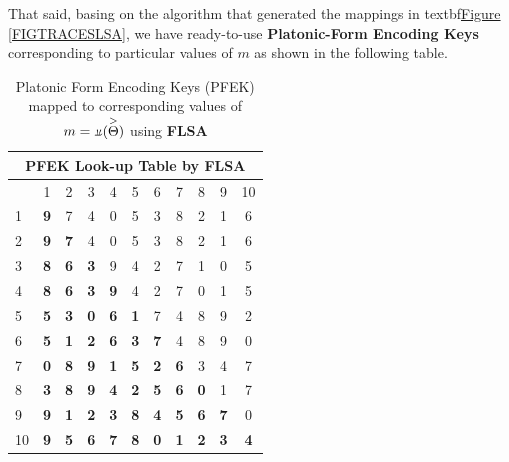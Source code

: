 \documentclass[a4paper, 18pt]{book} %
\newcommand{\invpi}{\rotatebox[origin=c]{180}{$\pi$}}
\begin{document}
\begin{appendices}
That said, basing on the algorithm that generated the mappings in textbf{\hyperref[FIGTRACESLSA]{Figure \ref{FIGTRACESLSA}}}, we have ready-to-use \textbf{Platonic-Form Encoding Keys} corresponding to particular values of $m$ as shown in the following table.\\


\begin{table}[H]
  \centering
  \Large
	\begin{tabular}[t]{|p{6cm}||c|c|c|c|c|c|c|c|c|c|}
	\hline
	\multicolumn{11}{|c|}{\textbf{PFEK Look-up Table by FLSA}}\\
	\hline
	\hline
	\diagbox{$m = \invpi(\overset{>}{\Theta})$}{$I(\omega_i,\overset{>}{\Theta})$} & 1 & 2 & 3 & 4 & 5 & 6 & 7 & 8 & 9 & 10\\
	\hline
	\hline
	1 & \textbf{9} & 7 & 4 & 0 & 5 & 3 & 8 & 2 & 1 & 6\\ 
	\hline 
	2 & \textbf{9} & \textbf{7} & 4 & 0 & 5 & 3 & 8 & 2 & 1 & 6\\ 
	\hline 
	3 & \textbf{8} & \textbf{6} & \textbf{3} & 9 & 4 & 2 & 7 & 1 & 0 & 5\\ 
	\hline 
	4 & \textbf{8} & \textbf{6} & \textbf{3} & \textbf{9} & 4 & 2 & 7 & 0 & 1 & 5\\
	\hline
	5 & \textbf{5} & \textbf{3} & \textbf{0} & \textbf{6} & \textbf{1} & 7 & 4 & 8 & 9 & 2\\
	\hline
	6 & \textbf{5} & \textbf{1} & \textbf{2} & \textbf{6} & \textbf{3} & \textbf{7} & 4 & 8 & 9 & 0\\
	\hline 
	7 & \textbf{0} & \textbf{8} & \textbf{9} & \textbf{1} & \textbf{5} & \textbf{2} & \textbf{6} & 3 & 4 & 7\\
	\hline 
	8 & \textbf{3} & \textbf{8} & \textbf{9} & \textbf{4} & \textbf{2} & \textbf{5} & \textbf{6} & \textbf{0} & 1 & 7\\
	\hline
	9 & \textbf{9} & \textbf{1} & \textbf{2} & \textbf{3} & \textbf{8} & \textbf{4} & \textbf{5} & \textbf{6} & \textbf{7} & 0\\ 
	\hline
	10 & \textbf{9} & \textbf{5} & \textbf{6} & \textbf{7} & \textbf{8} & \textbf{0} & \textbf{1} & \textbf{2} & \textbf{3} & \textbf{4}\\
	\hline
	              
\end{tabular}
 \caption{Platonic Form Encoding Keys (PFEK) mapped to corresponding values of $m = \invpi(\overset{>}{\Theta})$ using \textbf{FLSA}}
  \label{TABFSLAPERK}
\end{table}



\end{appendices}
\end{document}
